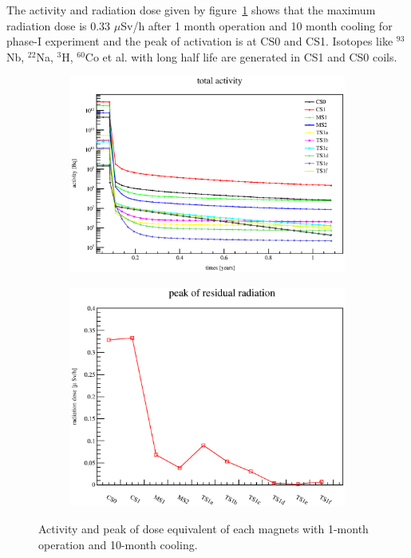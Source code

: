 The activity and radiation dose given by figure~\ref{2dose} shows that the maximum radiation dose is 0.33 $\mu$Sv/h after 1 month operation and 10 month cooling for phase-I experiment and the peak of activation is at CS0 and CS1.
Isotopes like $^{93}$Nb, $^{22}$Na, $^3$H, $^{60}$Co et al. with long half life are generated in CS1 and CS0 coils.
 \begin{figure}[H]
  \begin{subfigure}{0.3\textwidth}
   \centering
   \includegraphics[scale=0.45]{chapter3/fig/activity.eps}
  \end{subfigure}
  \hspace{0.2\textwidth}
  \begin{subfigure}{0.3\textwidth}
   \centering
   \includegraphics[scale=0.40]{chapter3/fig/dose.eps}
  \end{subfigure}
  \caption{Activity and peak of dose equivalent of each magnets with 1-month operation and 10-month cooling.}
  \label{2dose}
 \end{figure}

